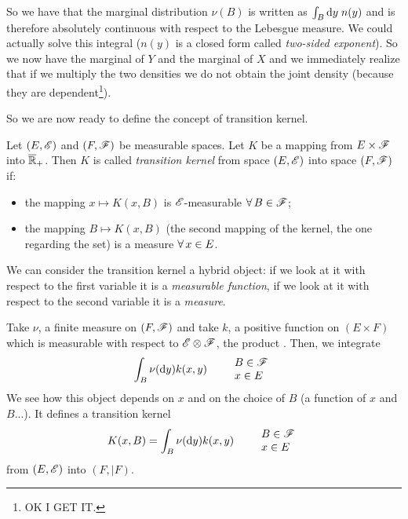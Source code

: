 \documentclass{report}
\begin{document}
So we have that the marginal distribution $\nu(B)$ is written as $\int_B \mathop{}\!\mathrm{d} y\;n(y)$ and is therefore absolutely continuous with respect to the Lebesgue measure. We could actually solve this integral ($n(y)$ is a closed form called \textit{two-sided exponent}). So we now have the marginal of $Y$ and the marginal of $X$ and we immediately realize that if we multiply the two densities we do not obtain the joint density (because they are dependent\footnote{OK I GET IT.}).\par
So we are now ready to define the concept of transition kernel.
\begin{definition}
	Let $(E,\mathscr{E})$ and $(F,\mathscr{F})$ be measurable spaces. Let $K$ be a mapping from $E\times\mathscr{F}$ into $\overline{\mathbb{R}}_+$. Then $K$ is called \emph{transition kernel} from space $(E,\mathscr{E})$ into space $(F,\mathscr{F})$ if:
	\begin{itemize}
		\item the mapping $x\mapsto K(x,B)$ is $\mathscr{E}$-measurable $\forall\, B\in\mathscr{F}$;
		\item the mapping $B\mapsto K(x,B)$ (the second mapping of the kernel, the one regarding the set) is a measure $\forall\, x\in E$.
	\end{itemize}
\end{definition}
We can consider the transition kernel a hybrid object: if we look at it with respect to the first variable it is a \textit{measurable function}, if we look at it with respect to the second variable it is a \textit{measure}.
\begin{example}
	Take $\nu$, a finite measure on $(F,\mathscr{F})$ and take $k$, a positive function on $(E\times F)$ which is measurable with respect to $\mathscr{E}\otimes\mathscr{F}$, the product \sa{}. Then, we integrate
	\[\int_B\nu(\mathop{}\!\mathrm{d} y)k(x,y)\qquad\begin{array}{l}
		B\in\mathscr{F}\\
		x\in E
	\end{array}\]
	We see how this object depends on $x$ and on the choice of $B$ (a function of $x$ and $B$...). It defines a transition kernel
	\[K(x,B)=\int_B\nu(\mathop{}\!\mathrm{d} y)k(x,y)\qquad\begin{array}{l}
		B\in\mathscr{F}\\
		x\in E
	\end{array}\]
	from $(E,\mathscr{E})$ into $(F,|F)$.
\end{example}
\end{document}
